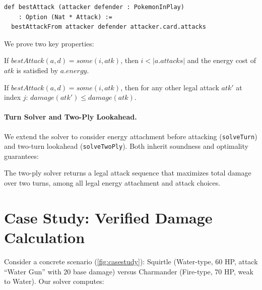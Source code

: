 \documentclass[a4paper,UKenglish,cleveref,autoref,anonymous]{lipics-v2021}
\begin{document}
\begin{lstlisting}[basicstyle=\ttfamily\small,columns=flexible]
def bestAttack (attacker defender : PokemonInPlay) 
    : Option (Nat * Attack) :=
  bestAttackFrom attacker defender attacker.card.attacks
\end{lstlisting}

\noindent We prove two key properties:

\begin{theorem}
If $\mathit{bestAttack}(a, d) = \mathit{some}(i, \mathit{atk})$, then $i < |a.\mathit{attacks}|$ and the energy cost of $\mathit{atk}$ is satisfied by $a.\mathit{energy}$.
\end{theorem}

\begin{theorem}
If $\mathit{bestAttack}(a, d) = \mathit{some}(i, \mathit{atk})$, then for any other legal attack $\mathit{atk}'$ at index $j$: $\mathit{damage}(\mathit{atk}') \leq \mathit{damage}(\mathit{atk})$.
\end{theorem}

\paragraph{Turn Solver and Two-Ply Lookahead.}
We extend the solver to consider energy attachment before attacking (\texttt{solveTurn}) and two-turn lookahead (\texttt{solveTwoPly}).
Both inherit soundness and optimality guarantees:

\begin{theorem}
The two-ply solver returns a legal attack sequence that maximizes total damage over two turns, among all legal energy attachment and attack choices.
\end{theorem}

\section{Case Study: Verified Damage Calculation}
\label{sec:casestudy}

Consider a concrete scenario (\cref{fig:casestudy}): Squirtle (Water-type, 60 HP, attack ``Water Gun'' with 20 base damage) versus Charmander (Fire-type, 70 HP, weak to Water).
Our solver computes:
\end{document}
